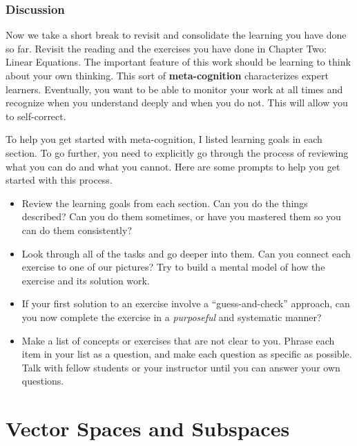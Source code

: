 \documentclass[10pt,]{book}
\newcommand{\terminology}[1]{\textbf{#1}}
\theoremstyle{plain}
\theoremstyle{definition}
\numberwithin{equation}{section}
\begin{document}
\subsection[Discussion]{Discussion}\label{subsection-57}
Now we take a short break to revisit and consolidate the learning you
    have done so far. Revisit the reading and the exercises you have done in
    Chapter Two: Linear Equations. The important feature of this work should be
    learning to think about your own thinking. This sort of \terminology{meta-cognition}
    characterizes expert learners. Eventually, you want to be able to monitor
    your work at all times and recognize when you understand deeply and when
    you do not. This will allow you to self-correct.
\par
To help you get started with meta-cognition, I listed learning goals in
    each section. To go further, you need to explicitly go through the process
    of reviewing what you can do and what you cannot. Here are some prompts to
    help you get started with this process.
    \begin{itemize}
\item{}
        Review the learning goals from each section. Can you do the things
        described? Can you do them sometimes, or have you mastered them so you
        can do them consistently?
      \item{}
        Look through all of the tasks and go deeper into them. Can you
        connect each exercise to one of our pictures? Try to build a mental
        model of how the exercise and its solution work.
      \item{}
        If your first solution to an exercise involve a ``guess-and-check''
        approach, can you now complete the exercise in a \emph{purposeful}
        and systematic manner?
      \item{}
        Make a list of concepts or exercises that are not clear to you. Phrase
        each item in your list as a question, and make each question as
        specific as possible. Talk with fellow students or your
        instructor until you can answer your own questions.
      \end{itemize}

\clearpage
\typeout{************************************************}
\typeout{************************************************}
\chapter[Vector Spaces and Subspaces]{Vector Spaces and Subspaces}\label{chapter-subspaces}
\end{document}
